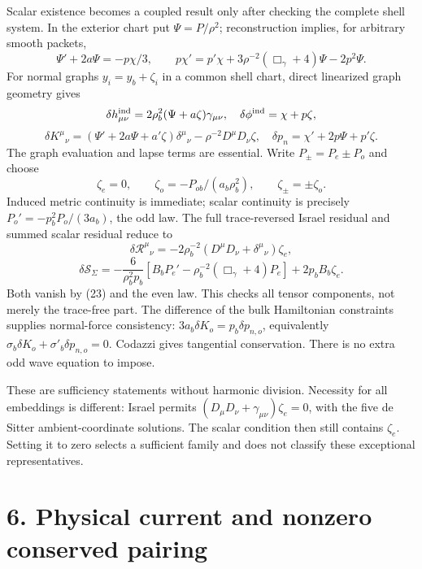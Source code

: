 \documentclass[
  10pt,
]{article}
\begin{document}
Scalar existence becomes a coupled result only after checking the
complete shell system. In the exterior chart put \(\Psi=P/\rho^2\);
reconstruction implies, for arbitrary smooth packets, \[
 \Psi'+2a\Psi=-p\chi/3,\qquad
 p\chi'=p'\chi+3\rho^{-2}(\Box_\gamma+4)\Psi-2p^2\Psi.    \tag{21}
\] For normal graphs \(y_i=y_b+\zeta_i\) in a common shell chart, direct
linearized graph geometry gives \[
 \delta h^{\rm ind}_{\mu\nu}=2\rho_b^2(\Psi+a\zeta)\gamma_{\mu\nu},
 \quad\delta\phi^{\rm ind}=\chi+p\zeta,
\] \[
 \delta K^\mu{}_{\nu}=(\Psi'+2a\Psi+a'\zeta)\delta^\mu{}_{\nu}
       -\rho^{-2}D^\mu D_\nu\zeta,
 \quad\delta p_n=\chi'+2p\Psi+p'\zeta.                    \tag{22}
\] The graph evaluation and lapse terms are essential. Write
\(P_\pm=P_e\pm P_o\) and choose \[
 \zeta_e=0,\qquad\zeta_o=-P_{ob}/(a_b\rho_b^2),\qquad
 \zeta_\pm=\pm\zeta_o.                                  \tag{23}
\] Induced metric continuity is immediate; scalar continuity is
precisely \(P_o'=-p_b^2P_o/(3a_b)\), the odd law. The full
trace-reversed Israel residual and summed scalar residual reduce to \[
 \delta\mathcal R^\mu{}_{\nu}
       =-2\rho_b^{-2}(D^\mu D_\nu+\delta^\mu{}_{\nu})\zeta_e,
\] \[
 \delta\mathcal S_\Sigma
 =-\frac6{\rho_b^2p_b}
       [B_bP_e'-\rho_b^{-2}(\Box_\gamma+4)P_e]
       +2p_bB_b\zeta_e.                                  \tag{24}
\] Both vanish by (23) and the even law. This checks all tensor
components, not merely the trace-free part. The difference of the bulk
Hamiltonian constraints supplies normal-force consistency:
\(3a_b\delta K_o=p_b\delta p_{n,o}\), equivalently
\(\sigma_b\delta K_o+\sigma'_b\delta p_{n,o}=0\). Codazzi gives
tangential conservation. There is no extra odd wave equation to impose.

These are sufficiency statements without harmonic division. Necessity
for all embeddings is different: Israel permits
\((D_\mu D_\nu+\gamma_{\mu\nu})\zeta_e=0\), with the five de Sitter
ambient-coordinate solutions. The scalar condition then still contains
\(\zeta_e\). Setting it to zero selects a sufficient family and does not
classify these exceptional representatives.

\section{6. Physical current and nonzero conserved
pairing}\label{physical-current-and-nonzero-conserved-pairing}
\end{document}
